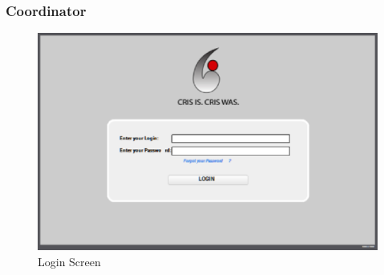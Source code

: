 \subsubsection{Coordinator}
\begin{figure}[htbp]
\begin{center}
 \caption{\label{fig:W0} Login Screen}
   \includegraphics[width=150mm]{./images/Web/login.eps}
\end{center}
\end{figure}
